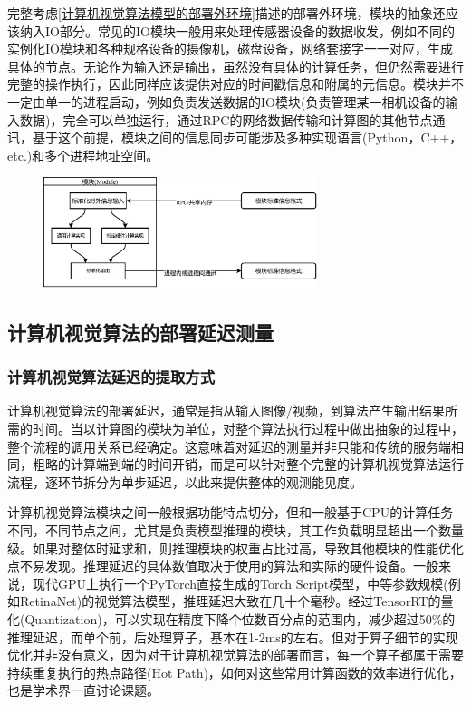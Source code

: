 \documentclass[master,anonymous]{shtthesis}
\begin{document}
完整考虑\ref{计算机视觉算法模型的部署外环境}描述的部署外环境，模块的抽象还应该纳入IO部分。常见的IO模块一般用来处理传感器设备的数据收发，例如不同的实例化IO模块和各种规格设备的摄像机，磁盘设备，网络套接字一一对应，生成具体的节点。无论作为输入还是输出，虽然没有具体的计算任务，但仍然需要进行完整的操作执行，因此同样应该提供对应的时间戳信息和附属的元信息。模块并不一定由单一的进程启动，例如负责发送数据的IO模块(负责管理某一相机设备的输入数据)，完全可以单独运行，通过RPC的网络数据传输和计算图的其他节点通讯，基于这个前提，模块之间的信息同步可能涉及多种实现语言(Python，C++，etc.)和多个进程地址空间。

\begin{figure}[htbp]
	\centering
	\includegraphics[width=8cm]{img/module.pdf}
	\label{模块的基本结构}
\end{figure}


\subsection{计算机视觉算法的部署延迟测量}\label{lantms}
\subsubsection{计算机视觉算法延迟的提取方式}\label{计算机视觉算法延迟的提取方式}
计算机视觉算法的部署延迟，通常是指从输入图像/视频，到算法产生输出结果所需的时间。当以计算图的模块为单位，对整个算法执行过程中做出抽象的过程中，整个流程的调用关系已经确定。这意味着对延迟的测量并非只能和传统的服务端相同，粗略的计算端到端的时间开销，而是可以针对整个完整的计算机视觉算法运行流程，逐环节拆分为单步延迟，以此来提供整体的观测能见度。

计算机视觉算法模块之间一般根据功能特点切分，但和一般基于CPU的计算任务不同，不同节点之间，尤其是负责模型推理的模块，其工作负载明显超出一个数量级。如果对整体时延求和，则推理模块的权重占比过高，导致其他模块的性能优化点不易发现。推理延迟的具体数值取决于使用的算法和实际的硬件设备。一般来说，现代GPU上执行一个PyTorch直接生成的Torch Script模型，中等参数规模(例如RetinaNet\cite{lin2017focal})的视觉算法模型，推理延迟大致在几十个毫秒。经过TensorRT的量化(Quantization)，可以实现在精度下降个位数百分点的范围内，减少超过50$\%$的推理延迟，而单个前，后处理算子，基本在1-2ms的左右。但对于算子细节的实现优化并非没有意义，因为对于计算机视觉算法的部署而言，每一个算子都属于需要持续重复执行的热点路径(Hot Path)，如何对这些常用计算函数的效率进行优化，也是学术界一直讨论课题\cite{cai2019maxpoolnms}。
\end{document}
